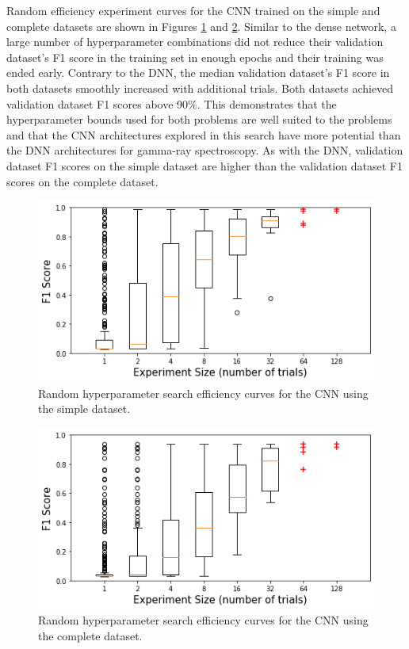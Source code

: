 Random efficiency experiment curves for the CNN trained on the simple and complete datasets are shown in Figures \ref{fig:random_hp_search_cnn_easy} and \ref{fig:random_hp_search_cnn_full}. Similar to the dense network, a large number of hyperparameter combinations did not reduce their validation dataset's F1 score in the training set in enough epochs and their training was ended early. Contrary to the DNN, the median validation dataset's F1 score in both datasets smoothly increased with additional trials. Both datasets achieved validation dataset F1 scores above 90$\%$. This demonstrates that the hyperparameter bounds used for both problems are well suited to the problems and that the CNN architectures explored in this search have more potential than the DNN architectures for gamma-ray spectroscopy. As with the DNN, validation dataset F1 scores on the simple dataset are higher than the validation dataset F1 scores on the complete dataset.

\begin{figure}[H]
	\centering
	\includegraphics[width=0.8\linewidth]{images/random_hp_search_cnn_easy}
	\caption{Random hyperparameter search efficiency curves for the CNN using the simple dataset.}
	\label{fig:random_hp_search_cnn_easy}
\end{figure}

\begin{figure}[H]
	\centering
	\includegraphics[width=0.8\linewidth]{images/random_hp_search_cnn_full}
	\caption{Random hyperparameter search efficiency curves for the CNN using the complete dataset.}
	\label{fig:random_hp_search_cnn_full}
\end{figure}


